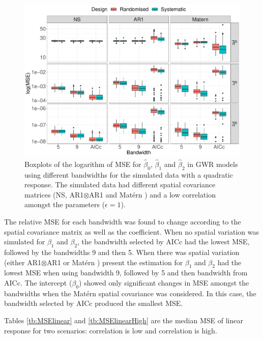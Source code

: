 \documentclass[a4paper]{article} 	%
\newcommand{\Matern}{Mat\'ern }
\begin{document}
\begin{figure}[H]
	\centering
	\includegraphics[width=\linewidth]{Expt/Col_QuaCombMSE_newpar.pdf}
	\caption{Boxplots of the logarithm of MSE for $\hat{\beta}_0$, $\hat{\beta}_1$ and $\hat{\beta}_2$ in GWR models using different bandwidths for the simulated data with a quadratic response. The simulated data had different spatial covariance matrices (NS, AR1$\otimes$AR1 and \Matern) and a low correlation amongst the parameters ($\epsilon=1$).} \label{fig:QuadBetaMSE}
\end{figure}


The relative MSE for each bandwidth was found to change according to the spatial covariance matrix as well as the coefficient. When no spatial variation was simulated for $\beta_1$ and $\beta_2$, the bandwidth selected by AICc had the lowest MSE, followed by the bandwidths 9 and then 5. When there was spatial variation (either AR1$\otimes$AR1 or \Matern) present the estimation for $\beta_1$ and $\beta_2$ had the lowest MSE when using bandwidth 9, followed by 5 and then bandwidth from AICc. The intercept ($\beta_0$) showed only significant changes in MSE amongst the bandwidths when the \Matern spatial covariance was considered. In this case, the bandwidth selected by AICc produced the smallest MSE.

Tables \ref{tb:MSElinear} and \ref{tb:MSElinearHigh} are the median MSE of linear response for two scenarios: correlation is low and correlation is high.
\end{document}
